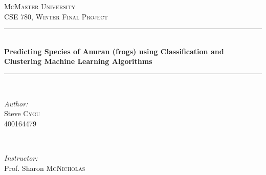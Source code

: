 \begin{titlepage}

\newcommand{\HRule}{\rule{\linewidth}{0.5mm}} %

\center %


\textsc{\LARGE McMaster University}\\[1.5cm] %
\textsc{\Large CSE 780, Winter Final Project}\\[0.5cm] %


\HRule \\[0.4cm]
{ \Huge \bfseries Predicting Species of Anuran (frogs) using Classification and Clustering Machine Learning Algorithms}\\[0.4cm] %
\HRule \\[1.5cm]


\begin{minipage}{0.4\textwidth}
\begin{flushleft} \large
\emph{Author:}\\
Steve \textsc{Cygu}\\
400164479 %
\end{flushleft}
\end{minipage}
~
\begin{minipage}{0.4\textwidth}
\begin{flushright} \large
\emph{Instructor:} \\
Prof. Sharon \textsc{McNicholas} %
\end{flushright}
\end{minipage}\\[2cm]


\end{titlepage}
